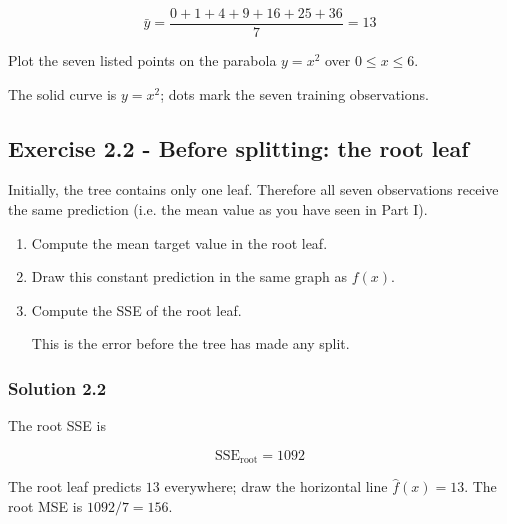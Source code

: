 \documentclass[10pt]{article}
\begin{document}
\[
\bar y=\frac{0+1+4+9+16+25+36}{7}=13
\]

Plot the seven listed points on the parabola $y=x^2$ over
$0\leq x\leq6$.


The solid curve is $y=x^2$; dots mark the seven training observations.
\begin{center}
\end{center}
\par\endgroup

\subsection*{Exercise 2.2 - Before splitting: the root leaf}
Initially, the tree contains only one leaf. Therefore all seven observations receive the same prediction (i.e. the mean value as you have seen in Part I).

\begin{enumerate}
\item
Compute the mean target value in the root leaf.

\item
Draw this constant prediction in the same graph as $f(x)$.

\item
Compute the SSE of the root leaf.

This is the error before the tree has made any split.

\end{enumerate}
\begingroup\color{red}

\subsubsection*{Solution 2.2}
The root SSE is

\[
\mathrm{SSE}_{\mathrm{root}}=1092
\]

The root leaf predicts $13$ everywhere; draw the horizontal line
$\hat f(x)=13$. The root MSE is $1092/7=156$.
\end{document}

